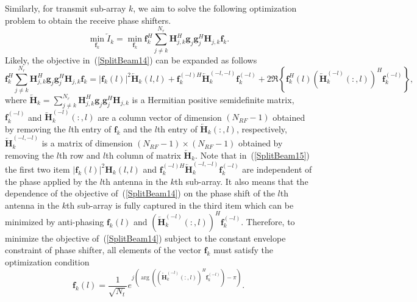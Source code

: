 \documentclass[11pt,draftcls,onecolumn]{IEEEtran}
\begin{document}
Similarly, for transmit sub-array $k$, we aim to solve the following optimization problem to obtain the receive phase shifters.
\begin{equation}\label{SplitBeam14}
\min_{\bm{f}_{k}}\overleftarrow{I}_{k}=\min_{\bm{f}_{k}}\bm{f}_{k}^{H}\sum_{j\neq k}^{N_{r}}\bm{H}_{j,k}^{H}\bm{g}_{j}\bm{g}_{j}^{H}\bm{H}_{j,k}\bm{f}_{k}.
\end{equation}
Likely, the objective in~(\ref{SplitBeam14}) can be expanded as follows
\begin{equation}\label{SplitBeam15}
\bm{f}_{k}^{H}\sum_{j\neq k}^{N_{r}}\bm{H}_{j,k}^{H}\bm{g}_{j}\bm{g}_{j}^{H}\bm{H}_{j,k}\bm{f}_{k}=
\left|\bm{f}_{k}\left(l\right)\right|^{2}\overleftarrow{\bm{H}}_{k}\left(l,l\right)+\bm{f}_{k}^{\left(-l\right)H}
\overleftarrow{\bm{H}}_{k}^{\left(-l,-l\right)}\bm{f}_{k}^{\left(-l\right)}+2\Re\left\{\bm{f}_{k}^{H}
\left(l\right)\left(\overleftarrow{\bm{H}}_{k}^{\left(-l\right)}\left(:,l\right)\right)^{H}\bm{f}_{k}^{\left(-l\right)}\right\},
\end{equation}
where $\overleftarrow{\bm{H}}_{k}=\sum\limits_{j\neq k}^{N_{r}}\bm{H}_{j,k}^{H}\bm{g}_{j}\bm{g}_{j}^{H}\bm{H}_{j,k}$ is a Hermitian positive semidefinite matrix,
$\bm{f}_{k}^{\left(-l\right)}$ and $\overleftarrow{\bm{H}}_{k}^{\left(-l\right)}\left(:,l\right)$ are a column vector of dimension $\left(N_{RF}-1\right)$ obtained by removing the $l$th entry of $\bm{f}_{k}$ and the $l$th entry of $\overleftarrow{\bm{H}}_{k}\left(:,l\right)$, respectively, $\overleftarrow{\bm{H}}_{k}^{\left(-l,-l\right)}$ is a matrix of dimension $\left(N_{RF}-1\right)\times \left(N_{RF}-1\right)$ obtained by removing the $l$th row and $l$th column of matrix $\overleftarrow{\bm{H}}_{k}$. Note that in~(\ref{SplitBeam15}) the first two item $\left|\bm{f}_{k}\left(l\right)\right|^{2}\bm{H}_{k}\left(l,l\right)$ and $\bm{f}_{k}^{\left(-l\right)H}\overleftarrow{\bm{H}}_{k}^{\left(-l,-l\right)}\bm{f}_{k}^{\left(-l\right)}$ are independent of the phase applied by the $l$th antenna in the $k$th sub-array. It also means that the dependence of the objective of~(\ref{SplitBeam14}) on the phase shift of the $l$th antenna in the $k$th sub-array is fully captured in the third item which can be minimized by anti-phasing $\bm{f}_{k}\left(l\right)$ and $\left(\overleftarrow{\bm{H}}_{k}^{\left(-l\right)}\left(:,l\right)\right)^{H}\bm{f}_{k}^{\left(-l\right)}$. Therefore, to minimize the objective of~(\ref{SplitBeam14}) subject to the constant envelope constraint of phase shifter, all elements of the vector $\bm{f}_{k}$ must satisfy the optimization condition
\begin{equation}\label{SplitBeam16}
\bm{f}_{k}\left(l\right)=\frac{1}{\sqrt{N_{t}}}e^{j\left(\arg\left(\left(\overleftarrow{\bm{H}}_{k}^{\left(-l\right)}
\left(:,l\right)\right)^{H}\bm{f}_{k}^{\left(-l\right)}\right)-\pi\right)}.
\end{equation}
\end{document}
